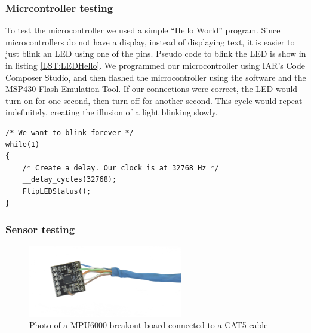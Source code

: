 \subsubsection{Micrcontroller testing}
To test the microcontroller we used a simple ``Hello World'' program.
Since microcontrollers do not have a display, instead of displaying text,
it is easier to just blink an LED using one of the pins.
Pseudo code to blink the LED is show in in listing \ref{LST:LEDHello}.
We programmed our microcontroller using IAR's Code Composer Studio,
and then flashed the microcontroller using the software and the MSP430 Flash Emulation Tool.
If our connections were correct,
the LED would turn on for one second,
then turn off for another second.
This cycle would repeat indefinitely, creating the illusion of a light blinking slowly.


\begin{lstlisting}[caption=Program to blink LED.,label=LST:LEDHello]
/* We want to blink forever */
while(1)
{
	/* Create a delay. Our clock is at 32768 Hz */
	__delay_cycles(32768);
	FlipLEDStatus();  
}
\end{lstlisting}

\subsubsection{Sensor testing}
\label{Sec:SensorTesting}
\begin{figure}
\begin{center}
\includegraphics[width=0.6\textwidth]{images/CAT6MPU.jpg}
\caption{Photo of a MPU6000 breakout board connected to a CAT5 cable}
\label{Fig:CAt5MPU}
\end{center}
\end{figure}

